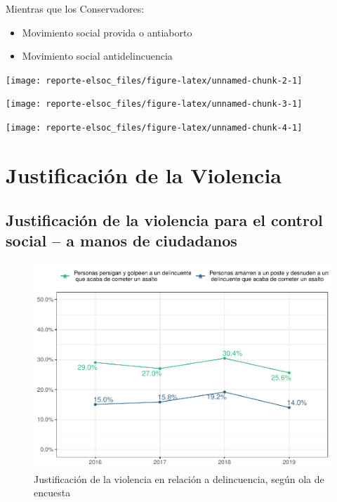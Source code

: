 \documentclass[
  12pt,
]{book}
\providecommand{\tightlist}{%
  \setlength{\itemsep}{0pt}\setlength{\parskip}{0pt}}
\begin{document}
Mientras que los Conservadores:

\begin{itemize}
\tightlist
\item
  Movimiento social provida o antiaborto
\item
  Movimiento social antidelincuencia
\end{itemize}

\begin{center}\texttt{[image: reporte-elsoc\_files/figure-latex/unnamed-chunk-2-1]} \end{center}

\begin{center}\texttt{[image: reporte-elsoc\_files/figure-latex/unnamed-chunk-3-1]} \end{center}

\begin{center}\texttt{[image: reporte-elsoc\_files/figure-latex/unnamed-chunk-4-1]} \end{center}

\hypertarget{justificaciuxf3n-de-la-violencia}{%
\section{Justificación de la Violencia}\label{justificaciuxf3n-de-la-violencia}}

\hypertarget{justificaciuxf3n-de-la-violencia-para-el-control-social-a-manos-de-ciudadanos}{%
\subsection{Justificación de la violencia para el control social -- a manos de ciudadanos}\label{justificaciuxf3n-de-la-violencia-para-el-control-social-a-manos-de-ciudadanos}}

\begin{figure}

{\centering \includegraphics{reporte-elsoc_files/figure-latex/just-vio-ola-1} 

}

\caption{Justificación de la violencia en relación a delincuencia, según ola de encuesta}\label{fig:just-vio-ola}
\end{figure}
\end{document}
